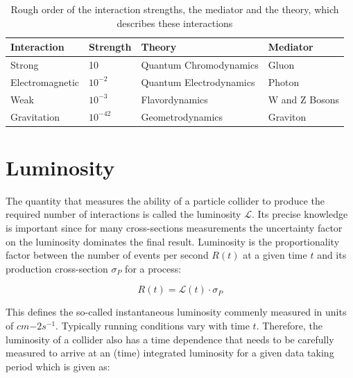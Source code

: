 \begin{table}
\begin{center}
    \begin{tabular}{| l | l | l | l |}
    \hline
    {\bf Interaction} & {\bf Strength} & {\bf Theory} & {\bf Mediator} \\ \hline
    Strong & 10 & Quantum Chromodynamics & Gluon \\ \hline
    Electromagnetic & $10^{-2}$ & Quantum Electrodynamics & Photon \\ \hline
    Weak & $10^{-3}$ & Flavordynamics &  W and Z Bosons\\ \hline
    Gravitation & $10^{-42}$ & Geometrodynamics & Graviton \\
    \hline
    \end{tabular}
     \caption{Rough order of the interaction strengths, the mediator and the theory, which describes
these interactions}

\end{center}
\end{table}


\section{Luminosity}

The quantity that measures the ability of a particle collider to produce the required number of interactions is called the luminosity $\mathcal{L}$. Its precise knowledge is important since for many cross-sections measurements the uncertainty factor on the luminosity dominates the final result. Luminosity is the proportionality factor between the number of events per second $R(t)$ at a given time $t$ and its production cross-section $\sigma_{P}$ for a process:

\begin{equation} \label{eq:rate}
R(t) = \mathcal{L}(t) \cdot \sigma_{P}
\end{equation}

This defines the so-called instantaneous luminosity commenly measured in units of $cm{-2} s^{-1}$. Typically running conditions vary with time $t$. Therefore, the luminosity of a collider also has a time dependence that needs to be carefully measured to arrive at an (time) integrated luminosity for a given data taking period which is given as:

